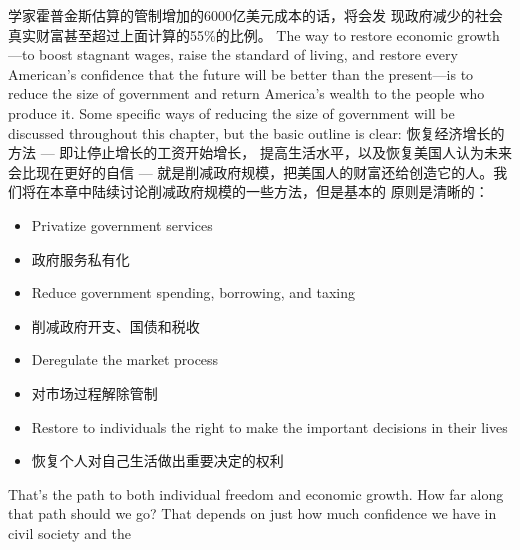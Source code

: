 \begin{paracol}{2}
学家霍普金斯估算的管制增加的6000亿美元成本的话，将会发
现政府减少的社会真实财富甚至超过上面计算的55\%的比例。
\switchcolumn*
The way to restore economic growth---to boost stagnant
wages, raise the standard of living, and restore every American's confidence that the future will be better than the present---is to reduce the size of government and return America's
wealth to the people who produce it. Some specific ways of reducing the size of government will be discussed throughout this
chapter, but the basic outline is clear:
\switchcolumn
恢复经济增长的方法 --- 即让停止增长的工资开始增长，
提高生活水平，以及恢复美国人认为未来会比现在更好的自信
--- 就是削减政府规模，把美国人的财富还给创造它的人。我
们将在本章中陆续讨论削减政府规模的一些方法，但是基本的
原则是清晰的：  
\switchcolumn*
\begin{itemize}
	\item Privatize government services
\end{itemize}
\switchcolumn
\begin{itemize}
	\item  政府服务私有化
\end{itemize}
\switchcolumn*
\begin{itemize}
	\item Reduce government spending, borrowing, and taxing
\end{itemize}
\switchcolumn
\begin{itemize}
	\item 削减政府开支、国债和税收
\end{itemize}
\switchcolumn*
\begin{itemize}
	\item Deregulate the market process
\end{itemize}
\switchcolumn
\begin{itemize}
	\item 对市场过程解除管制
\end{itemize}
\switchcolumn*
\begin{itemize}
	\item Restore to individuals the right to make the important decisions in their lives
\end{itemize}
\switchcolumn
\begin{itemize}
	\item 恢复个人对自己生活做出重要决定的权利
\end{itemize}
\switchcolumn*
That's the path to both individual freedom and economic
growth. How far along that path should we go? That depends
on just how much confidence we have in civil society and the

\end{paracol}
